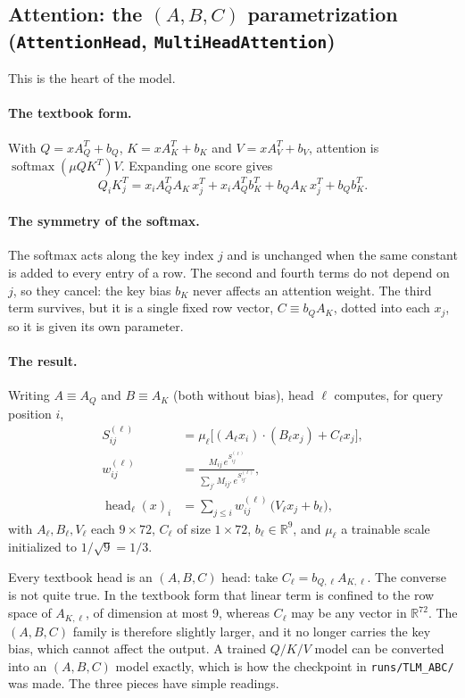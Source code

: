 \documentclass[11pt]{article}
\newcommand{\code}[1]{\texttt{#1}}
\newcommand{\R}{\mathbb{R}}
\newcommand{\softmax}{\operatorname{softmax}}
\begin{document}
\subsection{Attention: the $(A,B,C)$ parametrization (\code{AttentionHead}, \code{MultiHeadAttention})}

This is the heart of the model.

\paragraph{The textbook form.} With $Q=xA_Q^T+b_Q$, $K=xA_K^T+b_K$ and
$V=xA_V^T+b_V$, attention is $\softmax(\mu QK^T)V$. Expanding one score gives
\begin{equation}
  Q_iK_j^T = x_iA_Q^TA_K\,x_j^T + x_iA_Q^Tb_K^T + b_QA_K\,x_j^T + b_Qb_K^T .
\end{equation}

\paragraph{The symmetry of the softmax.} The softmax acts along the key index $j$ and
is unchanged when the same constant is added to every entry of a row. The second and
fourth terms do not depend on $j$, so they cancel: the key bias $b_K$ never affects an
attention weight. The third term survives, but it is a single fixed row vector,
$C\equiv b_QA_K$, dotted into each $x_j$, so it is given its own parameter.

\paragraph{The result.} Writing $A\equiv A_Q$ and $B\equiv A_K$ (both without bias),
head $\ell$ computes, for query position $i$,
\begin{align}
  S^{(\ell)}_{ij} &= \mu_\ell\big[(A_\ell x_i)\cdot(B_\ell x_j)+C_\ell x_j\big], \\
  w^{(\ell)}_{ij} &= \frac{M_{ij}\,e^{S^{(\ell)}_{ij}}}{\sum_{j'}M_{ij'}\,e^{S^{(\ell)}_{ij'}}}, \\
  \operatorname{head}_\ell(x)_i &= \sum_{j\le i} w^{(\ell)}_{ij}\,\big(V_\ell x_j+b_\ell\big),
\end{align}
with $A_\ell,B_\ell,V_\ell$ each $9\times72$, $C_\ell$ of size $1\times72$,
$b_\ell\in\R^9$, and $\mu_\ell$ a trainable scale initialized to $1/\sqrt9=1/3$.

Every textbook head is an $(A,B,C)$ head: take $C_\ell=b_{Q,\ell}A_{K,\ell}$. The
converse is not quite true. In the textbook form that linear term is confined to the
row space of $A_{K,\ell}$, of dimension at most 9, whereas $C_\ell$ may be any vector in
$\R^{72}$. The $(A,B,C)$ family is therefore slightly larger, and it no longer carries
the key bias, which cannot affect the output. A trained $Q/K/V$ model can be converted
into an $(A,B,C)$ model exactly, which is how the checkpoint in \code{runs/TLM\_ABC/}
was made. The three pieces have simple readings.
\end{document}
